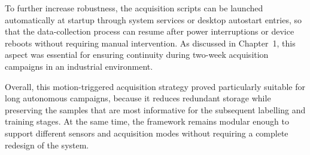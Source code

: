 To further increase robustness, the acquisition scripts can be launched automatically at startup through system services or desktop autostart entries, so that the data-collection process can resume after power interruptions or device reboots without requiring manual intervention.\cite{labby_kinect_acquisition_2026,systemd_service_2026} As discussed in Chapter~1, this aspect was essential for ensuring continuity during two-week acquisition campaigns in an industrial environment.

Overall, this motion-triggered acquisition strategy proved particularly suitable for long autonomous campaigns, because it reduces redundant storage while preserving the samples that are most informative for the subsequent labelling and training stages. At the same time, the framework remains modular enough to support different sensors and acquisition modes without requiring a complete redesign of the system.\cite{labby_kinect_acquisition_2026}
